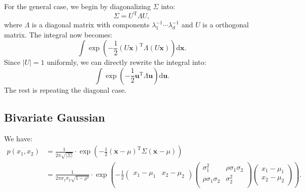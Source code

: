 \documentclass[UTF8]{ctexart}
\begin{document}
For the general case, we begin by diagonalizing $\Sigma$ into:
$$\Sigma=U^{\text{T}}\Lambda U,$$
where $\Lambda$ is a diagonal matrix with components $\lambda_{1}^{-1}\cdots \lambda_{d}^{-1}$ and $U$ is a orthogonal matrix.
The integral now becomes:
$$\int\exp\left(-\frac{1}{2}\left(U\textbf{x}\right)^{\text{T}}\Lambda\left(U\textbf{x}\right) \right)\text{d}\textbf{x}.$$
Since $|U|=1$ uniformly, we can directly rewrite the integral into:
$$\int\exp\left(-\frac{1}{2}\textbf{u}^{\text{T}}\Lambda\textbf{u} \right)\text{d}\textbf{u}.$$
The rest is repeating the diagonal case.

\subsection{Bivariate Gaussian}
We have:
$$
\begin{aligned}
p(x_{1},x_{2})&=\frac{1}{2\pi\sqrt{|\Sigma|}}\cdot\exp\left(-\frac{1}{2}(\textbf{x}-\mu)^{\text{T}}\Sigma (\textbf{x}-\mu) \right)\\
&=\frac{1}{2\pi\sigma_{1}\sigma_{2}\sqrt{1-\rho^{2}}}\cdot \exp\left(-\frac{1}{2}\begin{pmatrix}
x_{1}-\mu_{1} & x_{2}-\mu_{2}
\end{pmatrix}
\begin{pmatrix}
\sigma^{2}_{1} & \rho\sigma_{1}\sigma_{2} \\
\rho\sigma_{1}\sigma_{2} & \sigma^{2}_{2} \\
\end{pmatrix}
\begin{pmatrix}
x_{1}-\mu_{1} \\
 x_{2}-\mu_{2}
\end{pmatrix}
 \right).
\end{aligned}
$$
\end{document}
